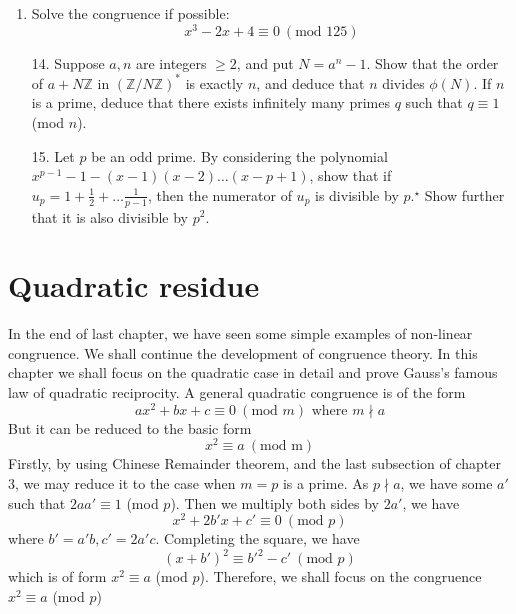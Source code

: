 \begin{enumerate}
\item Solve the congruence if possible:
$$ x^3 -2x +4 \equiv 0~(\text{mod } 125)$$
\item[14.] Suppose $a,n$ are integers $\ge 2$, and put $N=a^n-1$. Show that the order of $a+N\mathbb{Z}$ in $(\mathbb{Z}/N\mathbb{Z})^*$ is exactly $n$, and deduce that $n$ divides $\phi(N)$. If $n$ is a prime, deduce that there exists infinitely many primes $q$ such that $q \equiv 1$ (mod $n$).
\item[15.] Let $p$ be an odd prime. By considering the polynomial $x^{p-1}-1 - (x-1)(x-2)\ldots(x-p+1)$, show that if $u_p=1+\frac{1}{2}+\ldots \frac{1}{p-1}$, then the numerator of $u_p$ is divisible by $p$.$^{\star}$ Show further that it is also divisible by $p^2$.
\end{enumerate}

\section{Quadratic residue}
In the end of last chapter, we have seen some simple examples of non-linear congruence. We shall continue the development of congruence theory. In this chapter we shall focus on the quadratic case in detail and prove Gauss's famous law of quadratic reciprocity. A general quadratic congruence is of the form
$$ax^2+bx+c \equiv 0~(\text{mod } m) \text{ where } m \nmid a$$
But it can be reduced to the basic form $$x^2 \equiv a~(\text{mod m})$$
Firstly, by using Chinese Remainder theorem, and the last subsection of chapter 3, we may reduce it to the case when $m=p$ is a prime. As $p \nmid a$, we have some $a'$ such that $2aa' \equiv 1$ (mod $p$).
Then we multiply both sides by $2a'$, we have
$$x^2+2b'x+c' \equiv 0~(\text{mod } p)$$ where $b'=a'b,c'=2a'c$.
Completing the square, we have
$$(x+b')^2 \equiv {b'}^2-c'~(\text{mod } p)$$ which is of form $x^2 \equiv a$ (mod $p$).
Therefore, we shall focus on the congruence $x^2 \equiv a$ (mod $p$)
